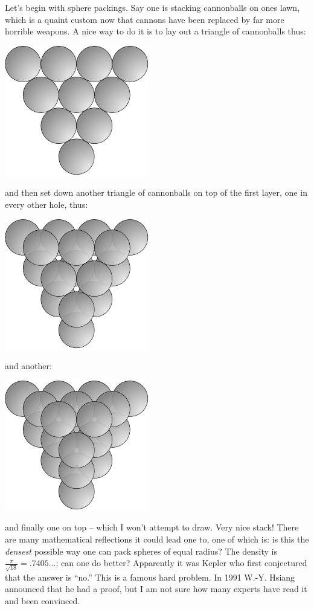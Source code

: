 Let's begin with sphere packings. Say one is stacking cannonballs on ones lawn, which is a quaint custom now that cannons have been replaced by far more horrible weapons. A nice way to do it is to lay out a triangle of cannonballs thus:
\begin{center}
\includegraphics[]{figures/wk20_fig1.pdf}
\end{center}
and then set down another triangle of cannonballs on top of the first layer, one in every other hole, thus:
\begin{center}
\includegraphics[]{figures/wk20_fig2.pdf}
\end{center}
%
and another:
\begin{center}
\includegraphics[]{figures/wk20_fig3.pdf}
\end{center}
%
and finally one on top -- which I won't attempt to draw. Very nice stack! There are many mathematical reflections it could lead one to, one of which is: is this the \emph{densest} possible way one can pack spheres of equal radius? The density is $\frac{\pi}{\sqrt{18}} = .7405...$; can one do better? Apparently it was Kepler who first conjectured that the answer is ``no.'' This is a famous hard problem. In 1991 W.-Y. Hsiang announced that he had a proof, but I am not sure how many experts have read it and been convinced.

